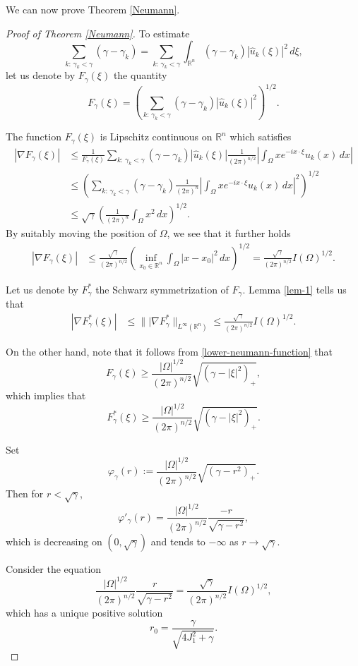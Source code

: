 \documentclass[11pt,twoside, leqno]{article}
\def\rr{{\mathbb R}}
\def\rn{{{\rr}^n}}
\numberwithin{equation}{section}
\begin{document}
We can now prove Theorem \ref{Neumann}.
\begin{proof}[Proof of Theorem \ref{Neumann}]
To estimate
$$\sum_{k:\,\gamma_k<\gamma} (\gamma-\gamma_k)=\sum_{k:\,\gamma_k<\gamma} \int_{\rn}(\gamma-\gamma_k)|\hat{u}_k(\xi)|^2\,d\xi,$$
let us denote by $F_\gamma(\xi)$ the quantity
$$F_\gamma(\xi)=\left(\sum_{k:\,\gamma_k<\gamma} (\gamma-\gamma_k)|\hat{u}_k(\xi)|^2\right)^{1/2}.$$


The function $F_\gamma(\xi)$ is Lipschitz continuous on $\rn$ which satisfies
\begin{align*}
|\nabla F_\gamma(\xi)|&\le \frac{1}{F_\gamma(\xi)} \sum_{k:\,\gamma_k<\gamma} (\gamma-\gamma_k) |\hat{u}_k(\xi)| \frac{1}{(2\pi)^{n/2}}\left|\int_\Omega xe^{-ix\cdot\xi}u_k(x)\,dx\right| \\
&\le \left(\sum_{k:\,\gamma_k<\gamma} (\gamma-\gamma_k) \frac{1}{(2\pi)^{n}}\left|\int_\Omega xe^{-ix\cdot\xi}u_k(x)\,dx\right|^2\right)^{1/2}\\
&\le \sqrt{\gamma}  \left( \frac{1}{(2\pi)^{n}}\int_\Omega x^2\,dx\right)^{1/2}.
\end{align*}
By suitably moving the position of $\Omega$, we see that it further holds
\begin{align*}
|\nabla F_\gamma(\xi)|&\le \frac{\sqrt\gamma}{(2\pi)^{n/2}}\left(\inf_{x_0\in\rn}\int_{\Omega}|x-x_0|^2\,dx\right)^{1/2}= \frac{\sqrt\gamma}{(2\pi)^{n/2}}I(\Omega)^{1/2}.
\end{align*}

Let us denote by $F_\gamma^\ast$ the Schwarz symmetrization of $F_\gamma$.
Lemma \ref{lem-1} tells us that
\begin{align*}
|\nabla F_\gamma^\ast(\xi)|&\le \||\nabla F_\gamma^\ast\|_{L^\infty(\rn)} \le  \frac{\sqrt\gamma}{(2\pi)^{n/2}}I(\Omega)^{1/2}.
\end{align*}


On the other hand, note that it follows from \eqref{lower-neumann-function} that
$$F_\gamma(\xi)\ge \frac{|\Omega|^{1/2}}{(2\pi)^{n/2}}\sqrt{(\gamma-|\xi|^2)_+},$$
which implies that
$$F_\gamma^\ast(\xi)\ge \frac{|\Omega|^{1/2}}{(2\pi)^{n/2}}\sqrt{(\gamma-|\xi|^2)_+}. $$



Set
$$\varphi_\gamma(r):=\frac{|\Omega|^{1/2}}{(2\pi)^{n/2}}\sqrt{(\gamma-r^2)_+}.$$
Then for $r<\sqrt\gamma$,
$$\varphi'_\gamma(r)=\frac{|\Omega|^{1/2}}{(2\pi)^{n/2}}\frac{-r}{\sqrt{\gamma-r^2}},$$
which is decreasing on $(0,\sqrt\gamma)$ and tends to $-\infty$ as $r\to\sqrt\gamma$.

Consider the equation
$$\frac{|\Omega|^{1/2}}{(2\pi)^{n/2}}\frac{r}{\sqrt{\gamma-r^2}}=\frac{\sqrt\gamma}{(2\pi)^{n/2}}I(\Omega)^{1/2},$$
which has a unique positive solution
$$r_0=\frac{\gamma}{\sqrt{4J_1^2+\gamma}}.$$


\end{proof}
\end{document}
